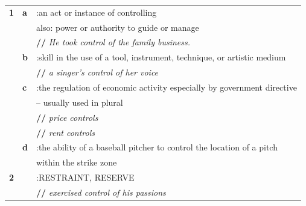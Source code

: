 \begin{frame}
\myPause
\begin{tabular}{lll}
 \bf{1} & \bf{a} & :an act or instance of controlling \\
        &        & also: power or authority to guide or manage \\
        &        & \textbf{//} \emph{He took control of the family business.} \\
        & \bf{b} & :skill in the use of a tool, instrument, technique, or artistic medium \\
        &        & \textbf{//} \emph{a singer's control of her voice} \\
        & \bf{c} & :the regulation of economic activity especially by government directive \\
        &        & -- usually used in plural \\
        &        & \textbf{//} \emph{price controls} \\
        &        & \textbf{//} \emph{rent controls} \\
        & \bf{d} & :the ability of a baseball pitcher to control the location of a pitch \\
        &        & within the strike zone \\
 \bf{2} &        & :RESTRAINT, RESERVE \\
        &        & \textbf{//} \emph{exercised control of his passions}
\end{tabular}
\end{frame}

